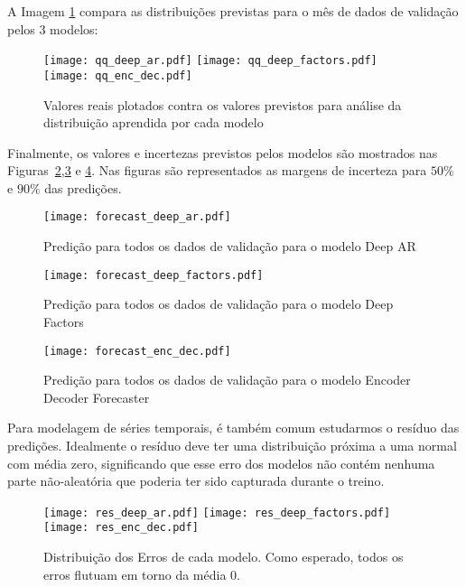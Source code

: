 A Imagem \ref{fig:distr} compara as distribuições previstas para o mês
de dados de validação pelos 3 modelos:

\begin{figure}[H]
\centering
\texttt{[image: qq\_deep\_ar.pdf]} \hfill
\texttt{[image: qq\_deep\_factors.pdf]} \hfill
\texttt{[image: qq\_enc\_dec.pdf]} 
\caption{Valores reais plotados contra os valores previstos para análise da distribuição aprendida por cada modelo} 
\label{fig:distr}
\end{figure}


Finalmente, os valores e incertezas previstos pelos modelos são mostrados nas
Figuras~\ref{fig:fordeepar},\ref{fig:fordeepfactors} e \ref{fig:forencdec}. Nas
figuras são representados as margens de incerteza para $50\%$ e $90\%$ das predições.

\begin{figure}[H]
  \centering
\texttt{[image: forecast\_deep\_ar.pdf]} 
\caption{Predição para todos os dados de validação para o modelo Deep AR}
\label{fig:fordeepar}
\end{figure}

\begin{figure}[H]
  \centering
\texttt{[image: forecast\_deep\_factors.pdf]} 
\caption{Predição para todos os dados de validação para o modelo Deep Factors}
\label{fig:fordeepfactors}
\end{figure}

\begin{figure}[H]
  \centering
\texttt{[image: forecast\_enc\_dec.pdf]} 
\caption{Predição para todos os dados de validação para o modelo Encoder Decoder Forecaster} 
\label{fig:forencdec}
\end{figure}


Para modelagem de séries temporais, é também comum estudarmos o resíduo das
predições. Idealmente o resíduo deve ter uma distribuição próxima a uma normal
com média zero, significando que esse erro dos modelos não contém nenhuma parte
não-aleatória que poderia ter sido capturada durante o treino. 

\begin{figure}[H]
\label{fig:res}
\centering
\texttt{[image: res\_deep\_ar.pdf]} \hfill
\texttt{[image: res\_deep\_factors.pdf]} \hfill
\texttt{[image: res\_enc\_dec.pdf]} 
\caption{Distribuição dos Erros de cada modelo. Como esperado, todos os erros flutuam em torno da média 0. } 
\end{figure}


